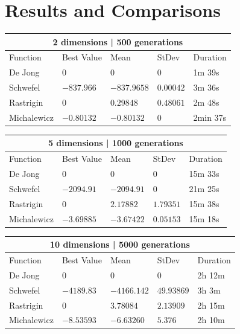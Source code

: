 \documentclass[12pt,leqno]{article}
\begin{document}
\vfill
\clearpage

\section{Results and Comparisons}

\begin{center}
  \begin{tabular}{|p{2.3cm}||p{3cm}|p{2cm}|p{2cm}|p{4.3cm}|} 
    \hline
    \multicolumn{5}{|c|}{2 dimensions | 500 generations} \\
    \hline
    Function    & Best Value & Mean & StDev & Duration \\ 
    \hline\hline
    De Jong     & $ 0 $ & $ 0 $ & $ 0 $ & 1m 39s \\ 
    \hline
    Schwefel    & $ -837.966 $ & $ -837.9658 $ & $ 0.00042 $ & 3m 36s \\ 
    \hline
    Rastrigin   & $ 0 $ & $ 0.29848 $ & $ 0.48061 $ & 2m 48s \\ 
    \hline
    Michalewicz & $ -0.80132 $ & $ -0.80132 $ & $ 0 $ & 2min 37s \\ 
    \hline
 \end{tabular}
\end{center}

\begin{center}
  \begin{tabular}{|p{2.3cm}||p{3cm}|p{2cm}|p{2cm}|p{4.3cm}|} 
    \hline
    \multicolumn{5}{|c|}{5 dimensions | 1000 generations} \\
    \hline
    Function    & Best Value & Mean & StDev & Duration \\ 
    \hline\hline
    De Jong     & $ 0 $ & $ 0 $ & $ 0 $ & 15m 33s \\ 
    \hline
    Schwefel    & $ -2094.91 $ & $ -2094.91 $ & $ 0 $ & 21m 25s \\ 
    \hline
    Rastrigin   & $ 0 $ & $ 2.17882 $ & $ 1.79351 $ & 15m 38s \\ 
    \hline
    Michalewicz & $ -3.69885 $ & $ -3.67422 $ & $ 0.05153 $ & 15m 18s \\ 
    \hline
 \end{tabular}
\end{center}

\begin{center}
  \begin{tabular}{|p{2.3cm}||p{3cm}|p{2cm}|p{2cm}|p{4.3cm}|} 
    \hline
    \multicolumn{5}{|c|}{10 dimensions | 5000 generations} \\
    \hline
    Function    & Best Value & Mean & StDev & Duration \\ 
    \hline\hline
    De Jong     & $ 0 $ & $ 0 $ & $ 0 $ & 2h 12m \\ 
    \hline
    Schwefel    & $ -4189.83 $ & $ -4166.142 $ & $ 49.93869 $ & 3h 3m \\ 
    \hline
    Rastrigin   & $ 0 $ & $ 3.78084 $ & $ 2.13909 $ & 2h 15m \\ 
    \hline
    Michalewicz & $ -8.53593 $ & $ -6.63260 $ & $ 5.376 $ & 2h 10m \\ 
    \hline
 \end{tabular}
\end{center}
\end{document}
